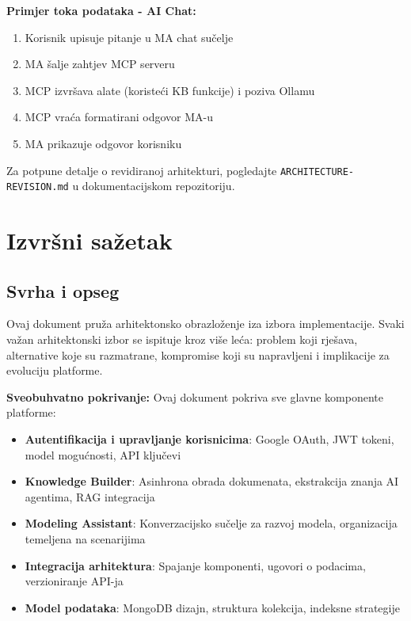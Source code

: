 \documentclass[12pt,a4paper]{article}
\begin{document}
\textbf{Primjer toka podataka - AI Chat:}
\begin{enumerate}[noitemsep]
    \item Korisnik upisuje pitanje u MA chat sučelje
    \item MA šalje zahtjev MCP serveru
    \item MCP izvršava alate (koristeći KB funkcije) i poziva Ollamu
    \item MCP vraća formatirani odgovor MA-u
    \item MA prikazuje odgovor korisniku
\end{enumerate}

Za potpune detalje o revidiranoj arhitekturi, pogledajte \texttt{ARCHITECTURE-REVISION.md} u dokumentacijskom repozitoriju.

\section{Izvršni sažetak}

\subsection{Svrha i opseg}

Ovaj dokument pruža arhitektonsko obrazloženje iza izbora implementacije. Svaki važan arhitektonski izbor se ispituje kroz više leća: problem koji rješava, alternative koje su razmatrane, kompromise koji su napravljeni i implikacije za evoluciju platforme.

\textbf{Sveobuhvatno pokrivanje:} Ovaj dokument pokriva sve glavne komponente platforme:

\begin{itemize}[leftmargin=*]
    \item \textbf{Autentifikacija i upravljanje korisnicima}: Google OAuth, JWT tokeni, model mogućnosti, API ključevi
    \item \textbf{Knowledge Builder}: Asinhrona obrada dokumenata, ekstrakcija znanja AI agentima, RAG integracija
    \item \textbf{Modeling Assistant}: Konverzacijsko sučelje za razvoj modela, organizacija temeljena na scenarijima
    \item \textbf{Integracija arhitektura}: Spajanje komponenti, ugovori o podacima, verzioniranje API-ja
    \item \textbf{Model podataka}: MongoDB dizajn, struktura kolekcija, indeksne strategije
\end{itemize}
\end{document}
